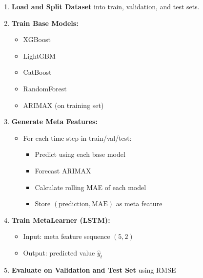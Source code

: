 \begin{enumerate}
    \item \textbf{Load and Split Dataset} into train, validation, and test sets.
    \item \textbf{Train Base Models:}
    \begin{itemize}
        \item XGBoost
        \item LightGBM
        \item CatBoost
        \item RandomForest
        \item ARIMAX (on training set)
    \end{itemize}
    \item \textbf{Generate Meta Features:}
    \begin{itemize}
        \item For each time step in train/val/test:
        \begin{itemize}
            \item Predict using each base model
            \item Forecast ARIMAX
            \item Calculate rolling MAE of each model
            \item Store $(\text{prediction}, \text{MAE})$ as meta feature
        \end{itemize}
    \end{itemize}
    \item \textbf{Train MetaLearner (LSTM):}
    \begin{itemize}
        \item Input: meta feature sequence $(5, 2)$
        \item Output: predicted value $\hat{y}_t$
    \end{itemize}
    \item \textbf{Evaluate on Validation and Test Set} using RMSE
\end{enumerate}




